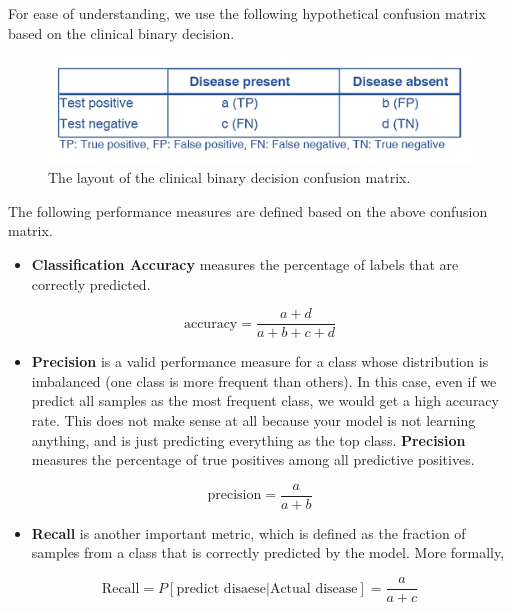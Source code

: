 \documentclass[
]{book}
\providecommand{\tightlist}{%
  \setlength{\itemsep}{0pt}\setlength{\parskip}{0pt}}
\begin{document}
For ease of understanding, we use the following hypothetical confusion matrix based on the clinical binary decision.

\begin{figure}

{\centering \includegraphics[width=0.8\linewidth]{img06/w06-ClinicalConfusionMatrix} 

}

\caption{The layout of the clinical binary decision confusion matrix.}\label{fig:unnamed-chunk-128}
\end{figure}

The following performance measures are defined based on the above confusion matrix.

\begin{itemize}
\tightlist
\item
  \textbf{Classification Accuracy} measures the percentage of labels that are correctly predicted.
\end{itemize}

\[
\mbox{accuracy} = \frac{a + d}{a + b + c + d}
\]

\begin{itemize}
\tightlist
\item
  \textbf{Precision} is a valid performance measure for a class whose distribution is imbalanced (one class is more frequent than others). In this case, even if we predict all samples as the most frequent class, we would get a high accuracy rate. This does not make sense at all because your model is not learning anything, and is just predicting everything as the top class. \textbf{Precision} measures the percentage of true positives among all predictive positives.
\end{itemize}

\[
\mbox{precision} = \frac{a}{a + b}
\]

\begin{itemize}
\tightlist
\item
  \textbf{Recall} is another important metric, which is defined as the fraction of samples from a class that is correctly predicted by the model. More formally,
\end{itemize}

\[
\mbox{Recall} = P[\mbox{predict disaese} | \mbox{Actual disease}] = \frac{a}{a+c}
\]
\end{document}
